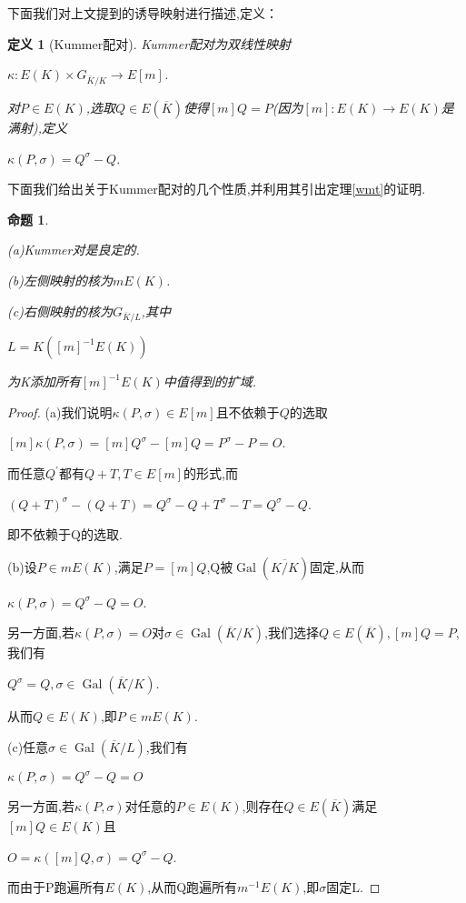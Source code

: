 \documentclass[11pt]{ctexart}
\DeclareMathOperator{\Gal}{Gal}
\newtheorem{defi}{定义}[section]
\newtheorem{pro}{命题}[section]
\begin{document}
下面我们对上文提到的诱导映射进行描述,定义：
\begin{defi}[Kummer配对]\label{KP}Kummer配对为双线性映射

    \begin{center}
        $\kappa:E(K)\times G_{\overline{K}/K} \rightarrow E[m]$.
    \end{center}
    对$P\in E(K)$,选取$Q\in E(\overline{K})$使得$[m]Q=P$(因为$[m]:E(K)\rightarrow E(K)$是满射),定义
    \begin{center}
        $\kappa(P,\sigma)=Q^{\sigma}-Q$.
    \end{center}
\end{defi}
下面我们给出关于Kummer配对的几个性质,并利用其引出定理\ref{wmt}的证明.
\begin{pro}\label{5.2}

    (a)Kummer对是良定的.

    (b)左侧映射的核为$mE(K)$.

    (c)右侧映射的核为$G_{\overline{K}/L}$,其中
     \begin{center}
        $L=K([m]^{-1}E(K))$
     \end{center}

      为K添加所有$[m]^{-1}E(K)$中值得到的扩域.
\end{pro}
\begin{proof}(a)我们说明$\kappa(P,\sigma)\in E[m]$且不依赖于$Q$的选取
\begin{center}
   $ [m]\kappa(P,\sigma)=[m]Q^{\sigma}-[m]Q=P^{\sigma}-P=O$.
\end{center}
而任意$Q^{\prime}$都有$Q+T,T\in E[m]$的形式,而
\begin{center}
    $(Q+T)^{\sigma}-(Q+T)=Q^{\sigma}-Q+T^{\sigma}-T=Q^{\sigma}-Q$.
\end{center}
即不依赖于Q的选取.

\noindent (b)设$P\in mE(K)$,满足$P=[m]Q$,Q被$\Gal(\overline{K/K})$固定,从而
\begin{center}
    $\kappa(P,\sigma)=Q^{\sigma}-Q=O$.
\end{center}
另一方面,若$\kappa(P,\sigma)=O$对$\sigma \in \Gal(\overline{K}/K)$,我们选择$Q\in E(\overline{K}),[m]Q=P$,我们有
\begin{center}
    $Q^{\sigma}=Q$$,\sigma \in \Gal(\overline{K}/K)$.
\end{center}
从而$Q\in E(K)$,即$P\in mE(K)$.


(c)任意$\sigma \in \Gal(\overline{K}/L)$,我们有
\begin{center}
    $\kappa(P,\sigma)=Q^{\sigma}-Q=O$
\end{center}
另一方面,若$\kappa(P,\sigma)$对任意的$P \in E(K)$,则存在$Q\in E(\overline{K})$满足$[m]Q\in E(K)$且
\begin{center}
    $O=\kappa([m]Q,\sigma)=Q^{\sigma}-Q$.
\end{center}
而由于P跑遍所有$E(K)$,从而Q跑遍所有$m^{-1}E(K)$,即$\sigma$固定L.
\end{proof}
\end{document}
